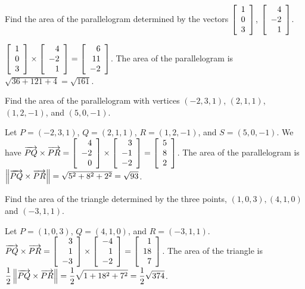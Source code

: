\documentclass{ximera}
\begin{document}
  \begin{example}
    Find the area of the parallelogram determined by the vectors
    $\startmat{r}
      1 \\
      0 \\
      3
    \stopmat$, $\startmat{r}
      4 \\
      -2 \\
      1
    \stopmat$.
    \begin{solution}
      $\startmat{r}
        1 \\
        0 \\
        3
      \stopmat \times
      \startmat{r}
        4 \\
        -2 \\
        1
      \stopmat = \startmat{r}
        6 \\
        11 \\
        -2
      \stopmat$. The area of the parallelogram is
      $\sqrt{36+121+4}=\sqrt{161}$. 
    \end{solution}
  \end{example}
  
  \begin{example}
    Find the area of the parallelogram with vertices $(-2,3,1)$,
    $(2,1,1)$, $(1,2,-1)$, and $(5,0,-1)$.
    \begin{solution}
      Let $P=(-2,3,1)$, $Q=(2,1,1)$, $R=(1,2,-1)$, and $S=(5,0,-1)$.
      We have
      $\longvect{PQ}\times\longvect{PR}
      =
      \startmat{r} 4 \\ -2 \\ 0 \stopmat
      \times
      \startmat{r} 3 \\ -1 \\ -2 \stopmat
      =
      \startmat{r} 5 \\ 8 \\ 2 \stopmat$.
      The area of the parallelogram is
      $\norm{\longvect{PQ}\times\longvect{PR}} = \sqrt{5^2+8^2+2^2} =
      \sqrt{93}$.
    \end{solution}
  \end{example}
  
  \begin{example}
    Find the area of the triangle determined by the three points,
    $(1,0,3),(4,1,0)$ and $(-3,1,1)$.
    \begin{solution}
      Let $P=(1,0,3)$, $Q=(4,1,0)$, and $R=(-3,1,1)$. 
      $\longvect{PQ}\times\longvect{PR}
      = \startmat{r}
        3 \\
        1 \\
        -3
      \stopmat \times \startmat{r}
        -4 \\
        1 \\
        -2
      \stopmat = \startmat{r}
        1 \\
        18 \\
        7
      \stopmat$. The area of the triangle is
      $\displaystyle\frac{1}{2}\norm{\longvect{PQ}\times\longvect{PR}} =
      \frac{1}{2}\sqrt{1+18^2+7^2}=\frac{1}{2}\sqrt{374}$. 
    \end{solution}
  \end{example}
  
\end{document}
